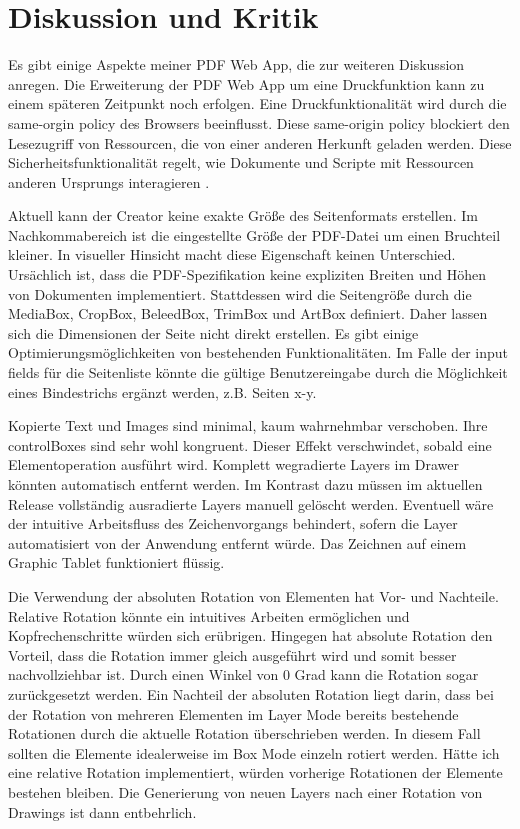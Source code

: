 \chapter{Diskussion und Kritik}
Es gibt einige Aspekte meiner PDF Web App, die zur weiteren Diskussion anregen. Die Erweiterung der PDF Web App um eine Druckfunktion kann zu einem späteren Zeitpunkt noch erfolgen. Eine Druckfunktionalität wird durch die same-orgin policy des Browsers beeinflusst. Diese same-origin policy blockiert den Lesezugriff von Ressourcen, die von einer anderen Herkunft geladen werden. Diese Sicherheitsfunktionalität regelt, wie Dokumente und Scripte mit Ressourcen anderen Ursprungs interagieren \cite{same-origin}. 
\par
Aktuell kann der Creator keine exakte Größe des Seitenformats erstellen. Im Nachkommabereich ist die eingestellte Größe der PDF-Datei um einen Bruchteil kleiner. In visueller Hinsicht macht diese Eigenschaft keinen Unterschied. Ursächlich ist, dass die PDF-Spezifikation keine expliziten Breiten und Höhen von Dokumenten implementiert. Stattdessen wird die Seitengröße durch die MediaBox, CropBox, BeleedBox, TrimBox und ArtBox definiert. Daher lassen sich die Dimensionen der Seite nicht direkt erstellen. Es gibt einige Optimierungsmöglichkeiten von bestehenden Funktionalitäten. Im Falle der input fields für die Seitenliste könnte die gültige Benutzereingabe durch die Möglichkeit eines Bindestrichs ergänzt werden, z.B. Seiten x-y. 
\par
Kopierte Text und Images sind minimal, kaum wahrnehmbar verschoben. Ihre controlBoxes sind sehr wohl kongruent. Dieser Effekt verschwindet, sobald eine Elementoperation ausführt wird. Komplett wegradierte Layers im Drawer könnten automatisch entfernt werden. Im Kontrast dazu müssen im aktuellen Release vollständig ausradierte Layers manuell gelöscht werden. Eventuell wäre der intuitive Arbeitsfluss des Zeichenvorgangs behindert, sofern die Layer automatisiert von der Anwendung entfernt würde. Das Zeichnen auf einem Graphic Tablet funktioniert flüssig. 
\par
Die Verwendung der absoluten Rotation von Elementen hat Vor- und Nachteile. Relative Rotation könnte ein intuitives Arbeiten ermöglichen und Kopfrechenschritte würden sich erübrigen. Hingegen hat absolute Rotation den Vorteil, dass die Rotation immer gleich ausgeführt wird und somit besser nachvollziehbar ist. Durch einen Winkel von 0 Grad kann die Rotation sogar zurückgesetzt werden. Ein Nachteil der absoluten Rotation liegt darin, dass bei der Rotation von mehreren Elementen im Layer Mode bereits bestehende Rotationen durch die aktuelle Rotation überschrieben werden. In diesem Fall sollten die Elemente idealerweise im Box Mode einzeln rotiert werden. Hätte ich eine relative Rotation implementiert, würden vorherige Rotationen der Elemente bestehen bleiben. Die Generierung von neuen Layers nach einer Rotation von Drawings ist dann entbehrlich. 
